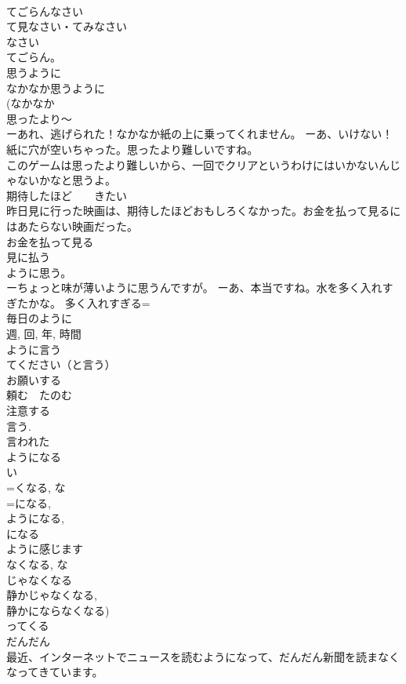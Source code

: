 \documentclass[8pt]{extreport}
\begin{document}
\begin{CJK}{UTF8}{min}
\\	てごらんなさい 
\\	て見なさい・てみなさい 
\\	なさい 
\\	てごらん。 
\\	思うように	
\\	なかなか思うように
\\	(なかなか 
\\	思ったより～ 
\\	ーあれ、逃げられた！なかなか紙の上に乗ってくれません。 ーあ、いけない！紙に穴が空いちゃった。思ったより難しいですね。 
\\	このゲームは思ったより難しいから、一回でクリアというわけにはいかないんじゃないかなと思うよ。 
\\	期待したほど　　きたい 
\\	昨日見に行った映画は、期待したほどおもしろくなかった。お金を払って見るにはあたらない映画だった。 
\\	お金を払って見る
\\	見に払う 
\\	ように思う。 
\\	ーちょっと味が薄いように思うんですが。 ーあ、本当ですね。水を多く入れすぎたかな。 多く入れすぎる=
\\	毎日のように 
\\	週, 回, 年, 時間
\\	ように言う 
\\	てください（と言う）　
\\	お願いする
\\	頼む　たのむ 
\\	注意する 
\\	言う. 
\\	言われた　
\\	ようになる 
\\	い
\\	=くなる, な
\\	=になる, 
\\	ようになる, 
\\	になる 
\\	ように感じます　
\\	なくなる, な
\\	じゃなくなる 
\\	静かじゃなくなる, 
\\	静かにならなくなる) 
\\	ってくる 
\\	だんだん 
\\	最近、インターネットでニュースを読むようになって、だんだん新聞を読まなくなってきています。 

\end{CJK}
\end{document}
